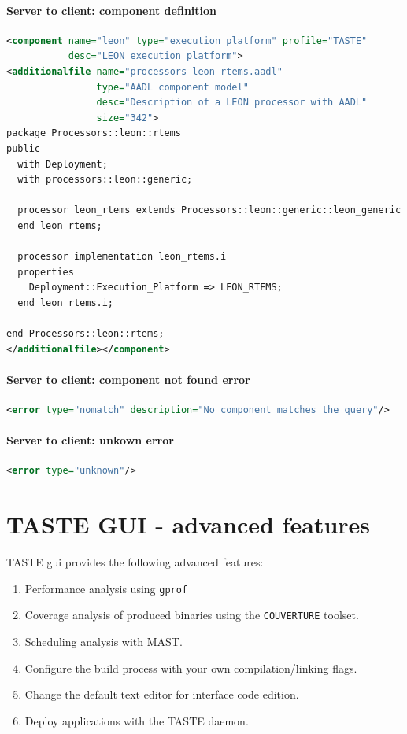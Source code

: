 \documentclass[11pt]{book}
\begin{document}
      \subsubsection{Server to client: component definition}
      \begin{lstlisting}[language=xml]
<component name="leon" type="execution platform" profile="TASTE" 
           desc="LEON execution platform">
<additionalfile name="processors-leon-rtems.aadl" 
                type="AADL component model" 
                desc="Description of a LEON processor with AADL" 
                size="342">
package Processors::leon::rtems
public
  with Deployment;
  with processors::leon::generic;
  
  processor leon_rtems extends Processors::leon::generic::leon_generic
  end leon_rtems;
  
  processor implementation leon_rtems.i
  properties
    Deployment::Execution_Platform => LEON_RTEMS;
  end leon_rtems.i;
  
end Processors::leon::rtems;
</additionalfile></component>
      \end{lstlisting}

      \subsubsection{Server to client: component not found error}
      \begin{lstlisting}[language=xml]
<error type="nomatch" description="No component matches the query"/>
      \end{lstlisting}

      \subsubsection{Server to client: unkown error}
      \begin{lstlisting}[language=xml]
<error type="unknown"/>
      \end{lstlisting}
 

\chapter{TASTE GUI - advanced features}
TASTE gui provides the following advanced features:
\begin{enumerate}
   \item
      Performance analysis using \texttt{gprof}
   \item
      Coverage analysis of produced binaries using the
      \texttt{COUVERTURE} toolset.
   \item
      Scheduling analysis with MAST.
   \item
      Configure the build process with your own compilation/linking flags.
   \item
      Change the default text editor for interface code edition.
   \item
      Deploy applications with the TASTE daemon.
\end{enumerate}
\end{document}
